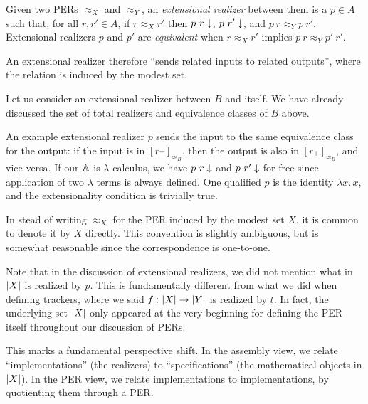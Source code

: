 \begin{definition}
    Given two PERs \(\approx_X\) and \(\approx_Y\), an \emph{extensional realizer} between them is a \(p \in A\) such that, for all \(r, r' \in A\), if \(r \approx_X r'\) then \(p\ r \downarrow\), \(p\ r' \downarrow\), and \(p\ r \approx_Y p\ r'\).  Extensional realizers \(p\) and \(p'\) are \emph{equivalent} when \(r \approx_X r'\) implies \(p\ r \approx_Y p'\ r'\).
\end{definition}

\begin{remark}
    An extensional realizer therefore ``sends related inputs to related outputs'', where the relation is induced by the modest set.
\end{remark}

\begin{example}
    Let us consider an extensional realizer between \(B\) and itself.  We have already discussed the set of total realizers and equivalence classes of \(B\) above.

    An example extensional realizer \(p\) sends the input to the same equivalence class for the output: if the input is in \([r_{\top}]_{\approx_B}\), then the output is also in \([r_{\bot}]_{\approx_B}\), and vice versa.  If our \(\mathbb{A}\) is \(\lambda\)-calculus, we have \(p\ r \downarrow\) and \(p\ r' \downarrow\) for free since application of two \(\lambda\) terms is always defined.  One qualified \(p\) is the identity \(\lambda x.\,x\), and the extensionality condition is trivially true.
\end{example}

\begin{notation}
    In stead of writing \(\approx_X\) for the PER induced by the modest set \(X\), it is common to denote it by \(X\) directly.  This convention is slightly ambiguous, but is somewhat reasonable since the correspondence is one-to-one.
\end{notation}

\begin{remark}
    Note that in the discussion of extensional realizers, we did not mention what in \(\vert X \vert\) is realized by \(p\).  This is fundamentally different from what we did when defining trackers, where we said \(f : \vert X \vert \rightarrow \vert Y \vert\) is realized by \(t\).  In fact, the underlying set \(\vert X \vert\) only appeared at the very beginning for defining the PER itself throughout our discussion of PERs.

    This marks a fundamental perspective shift.  In the assembly view, we relate ``implementations'' (the realizers) to ``specifications'' (the mathematical objects in \(\vert X \vert\)).  In the PER view, we relate implementations to implementations, by quotienting them through a PER.
\end{remark}

